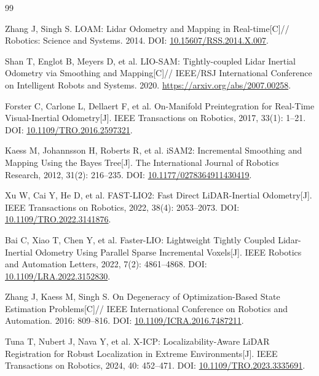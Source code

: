 \documentclass[UTF8,a4paper,12pt,fontset=fandol]{ctexart}
\begin{document}
\begingroup
\small
\renewcommand{\refname}{主要参考文献}
\begin{thebibliography}{99}
Zhang J, Singh S.
LOAM: Lidar Odometry and Mapping in Real-time[C]//
Robotics: Science and Systems. 2014.
DOI: \href{https://doi.org/10.15607/RSS.2014.X.007}{10.15607/RSS.2014.X.007}.

Shan T, Englot B, Meyers D, et al.
LIO-SAM: Tightly-coupled Lidar Inertial Odometry via Smoothing and Mapping[C]//
IEEE/RSJ International Conference on Intelligent Robots and Systems. 2020.
\url{https://arxiv.org/abs/2007.00258}.

Forster C, Carlone L, Dellaert F, et al.
On-Manifold Preintegration for Real-Time Visual-Inertial Odometry[J].
IEEE Transactions on Robotics, 2017, 33(1): 1--21.
DOI: \href{https://doi.org/10.1109/TRO.2016.2597321}{10.1109/TRO.2016.2597321}.

Kaess M, Johannsson H, Roberts R, et al.
iSAM2: Incremental Smoothing and Mapping Using the Bayes Tree[J].
The International Journal of Robotics Research, 2012, 31(2): 216--235.
DOI: \href{https://doi.org/10.1177/0278364911430419}{10.1177/0278364911430419}.

Xu W, Cai Y, He D, et al.
FAST-LIO2: Fast Direct LiDAR-Inertial Odometry[J].
IEEE Transactions on Robotics, 2022, 38(4): 2053--2073.
DOI: \href{https://doi.org/10.1109/TRO.2022.3141876}{10.1109/TRO.2022.3141876}.

Bai C, Xiao T, Chen Y, et al.
Faster-LIO: Lightweight Tightly Coupled Lidar-Inertial Odometry Using Parallel Sparse Incremental Voxels[J].
IEEE Robotics and Automation Letters, 2022, 7(2): 4861--4868.
DOI: \href{https://doi.org/10.1109/LRA.2022.3152830}{10.1109/LRA.2022.3152830}.

Zhang J, Kaess M, Singh S.
On Degeneracy of Optimization-Based State Estimation Problems[C]//
IEEE International Conference on Robotics and Automation. 2016: 809--816.
DOI: \href{https://doi.org/10.1109/ICRA.2016.7487211}{10.1109/ICRA.2016.7487211}.

Tuna T, Nubert J, Nava Y, et al.
X-ICP: Localizability-Aware LiDAR Registration for Robust Localization in Extreme Environments[J].
IEEE Transactions on Robotics, 2024, 40: 452--471.
DOI: \href{https://doi.org/10.1109/TRO.2023.3335691}{10.1109/TRO.2023.3335691}.


\end{thebibliography}
\end{document}
